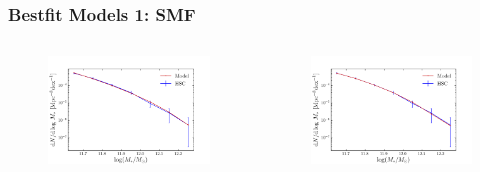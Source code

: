 \documentclass[t]{beamer}
\begin{document}
\begin{frame}
    \frametitle{Bestfit Models 1: SMF}

    \begin{columns}

    \begin{block}{\vmp{}}
        \begin{figure}
        \includegraphics[width=\textwidth]{images/fit_smf.png}
        \end{figure}
    \end{block}


    \begin{block}{\MhaloPeak{}}
        \begin{figure}
        \includegraphics[width=\textwidth]{images/fit_smf_mpeak.png}
        \end{figure}
    \end{block}
    \end{columns}

\end{frame}
\end{document}
